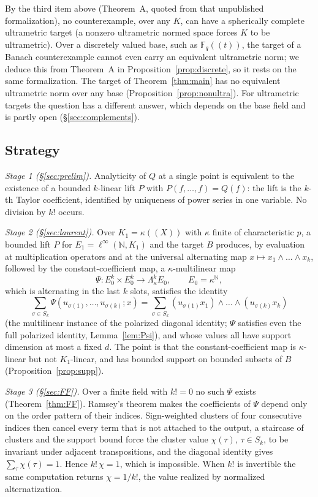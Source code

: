 \documentclass[11pt]{amsart}
\theoremstyle{definition}
\theoremstyle{remark}
\numberwithin{equation}{section}
\newcommand{\linf}{\ell^\infty}
\newcommand{\N}{\mathbb{N}}
\newcommand{\F}{\mathbb{F}}
\begin{document}
By the third item above (Theorem~A, quoted from that unpublished formalization), no counterexample, over any $K$, can
have a spherically complete ultrametric target (a nonzero ultrametric normed space forces $K$ to be ultrametric). Over a
discretely valued base, such as $\F_q((t))$, the target of a Banach counterexample cannot even carry an equivalent
ultrametric norm; we deduce this from Theorem~A in Proposition~\ref{prop:discrete}, so it rests on the same
formalization. The target of
Theorem~\ref{thm:main} has no equivalent ultrametric norm over any base (Proposition~\ref{prop:nonultra}). For
ultrametric targets the question has a different answer, which depends on the base field and is partly open
(\S\ref{sec:complements}).

\subsection*{Strategy}
\emph{Stage 1 (\S\ref{sec:prelim}).} Analyticity of $Q$ at a single point is equivalent to the existence of a bounded
$k$\nobreakdash-linear lift $P$ with $P(f,\dots,f)=Q(f)$: the lift is the $k$\nobreakdash-th Taylor coefficient, identified by uniqueness of
power series in one variable. No division by $k!$ occurs.

\emph{Stage 2 (\S\ref{sec:laurent}).} Over $K_1=\kappa((X))$ with $\kappa$ finite of characteristic $p$, a bounded lift
$P$ for $E_1=\linf(\N,K_1)$ and the target $B$ produces, by evaluation at multiplication operators and at the universal
alternating map $x\mapsto x_1\wedge\dots\wedge x_k$, followed by the constant-coefficient map, a $\kappa$\nobreakdash-multilinear
map
\[
\Psi\colon E_0^k\times E_0^k\to\Lambda^k_\kappa E_0,\qquad E_0=\kappa^\N,
\]
which is alternating in the last $k$ slots, satisfies the identity
\[
\sum_{\sigma\in S_k}\Psi(u_{\sigma(1)},\dots,u_{\sigma(k)};x)=\sum_{\sigma\in S_k}(u_{\sigma(1)}x_1)\wedge\dots\wedge(u_{\sigma(k)}x_k)
\]
(the multilinear instance of the polarized diagonal identity; $\Psi$ satisfies even the full polarized identity,
Lemma~\ref{lem:Psi}), and whose values all have support dimension at most a fixed $d$. The point is that the constant-coefficient map is
$\kappa$\nobreakdash-linear but not $K_1$\nobreakdash-linear, and has bounded support on bounded subsets of $B$ (Proposition~\ref{prop:supp}).

\emph{Stage 3 (\S\ref{sec:FF}).} Over a finite field with $k!=0$ no such $\Psi$ exists (Theorem~\ref{thm:FF}). Ramsey's
theorem makes the coefficients of $\Psi$ depend only on the order pattern of their indices. Sign-weighted clusters of
four consecutive indices then cancel every term that is not attached to the output, a staircase of clusters and the
support bound force the cluster value $\chi(\tau)$, $\tau\in S_k$, to be invariant under adjacent transpositions, and the
diagonal identity gives $\sum_\tau\chi(\tau)=1$. Hence $k!\,\chi=1$, which is impossible. When $k!$ is invertible the
same computation returns $\chi=1/k!$, the value realized by normalized alternatization.
\end{document}
